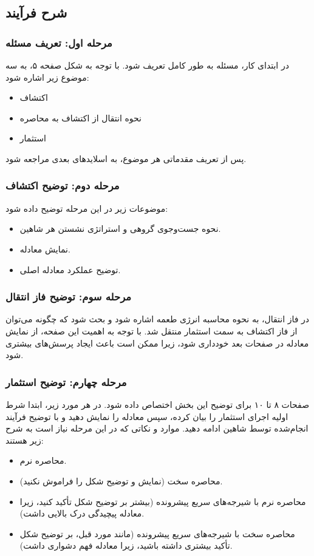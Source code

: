 \documentclass[12pt]{article}
\begin{document}
\subsection*{شرح فرآیند}
\subsubsection*{مرحله اول: تعریف مسئله}
در ابتدای کار، مسئله به طور کامل تعریف شود.  
با توجه به شکل صفحه ۵، به سه موضوع زیر اشاره شود:
\begin{itemize}
    \item اکتشاف
    \item نحوه انتقال از اکتشاف به محاصره
    \item استثمار
\end{itemize}
پس از تعریف مقدماتی هر موضوع، به اسلایدهای بعدی مراجعه شود.

\subsubsection*{مرحله دوم: توضیح اکتشاف}
موضوعات زیر در این مرحله توضیح داده شود:
\begin{itemize}
    \item نحوه جست‌وجوی گروهی و استراتژی نشستن هر شاهین.
    \item نمایش معادله.
    \item توضیح عملکرد معادله اصلی.
\end{itemize}

\subsubsection*{مرحله سوم: توضیح فاز انتقال}
در فاز انتقال، به نحوه محاسبه انرژی طعمه اشاره شود و بحث شود که چگونه می‌توان از فاز اکتشاف به سمت استثمار منتقل شد.  
با توجه به اهمیت این صفحه، از نمایش معادله در صفحات بعد خودداری شود، زیرا ممکن است باعث ایجاد پرسش‌های بیشتری شود.

\subsubsection*{مرحله چهارم: توضیح استثمار}
صفحات ۸ تا ۱۰ برای توضیح این بخش اختصاص داده شود.  
در هر مورد زیر، ابتدا شرط اولیه اجرای استثمار را بیان کرده، سپس معادله را نمایش دهید و با توضیح فرآیند انجام‌شده توسط شاهین ادامه دهید.  
موارد و نکاتی که در این مرحله نیاز است به شرح زیر هستند:
\begin{itemize}
    \item محاصره نرم.
    \item محاصره سخت (نمایش و توضیح شکل را فراموش نکنید).
    \item محاصره نرم با شیرجه‌های سریع پیشرونده (بیشتر بر توضیح شکل تأکید کنید، زیرا معادله پیچیدگی درک بالایی داشت).
    \item محاصره سخت با شیرجه‌های سریع پیشرونده (مانند مورد قبل، بر توضیح شکل تأکید بیشتری داشته باشید، زیرا معادله فهم دشواری داشت).
\end{itemize}
\end{document}
